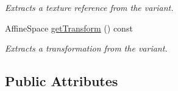 \begin{DoxyCompactItemize}
\begin{DoxyCompactList}\small\item\em Extracts a texture reference from the variant. \item\end{DoxyCompactList}\item 
AffineSpace \hyperlink{structembree_1_1_variant_aff8bbf7a08e748aac18dc8808a00ce3a}{getTransform} () const 
\begin{DoxyCompactList}\small\item\em Extracts a transformation from the variant. \item\end{DoxyCompactList}\end{DoxyCompactItemize}
\subsection*{Public Attributes}
